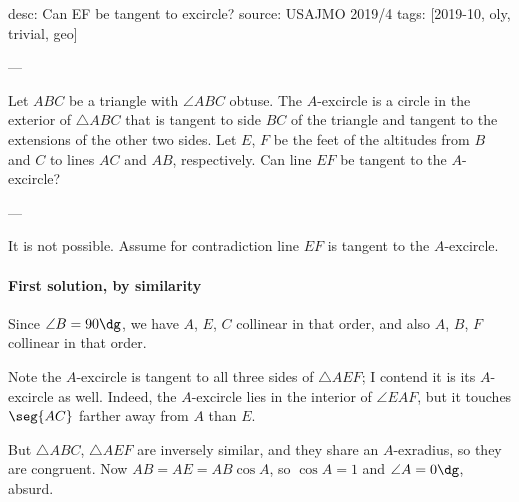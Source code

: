 desc: Can EF be tangent to excircle?
source: USAJMO 2019/4
tags: [2019-10, oly, trivial, geo]

---

Let $ABC$ be a triangle with $\angle ABC$ obtuse. The $A$-excircle is a circle in the exterior of $\triangle ABC$ that is tangent to side $BC$ of the triangle and tangent to the extensions of the other two sides. Let $E$, $F$ be the feet of the altitudes from $B$ and $C$ to lines $AC$ and $AB$, respectively. Can line $EF$ be tangent to the $A$-excircle?

---

It is not possible. Assume for contradiction line $EF$ is tangent to the $A$-excircle.

\paragraph{First solution, by similarity} Since $\angle B=90\dg$, we have $A$, $E$, $C$ collinear in that order, and also $A$, $B$, $F$ collinear in that order.

Note the $A$-excircle is tangent to all three sides of $\triangle AEF$; I contend it is its $A$-excircle as well. Indeed, the $A$-excircle lies in the interior of $\angle EAF$, but it touches $\seg{AC}$ farther away from $A$ than $E$.

But $\triangle ABC$, $\triangle AEF$ are inversely similar, and they share an $A$-exradius, so they are congruent. Now $AB=AE=AB\cos A$, so $\cos A=1$ and $\angle A=0\dg$, absurd.

